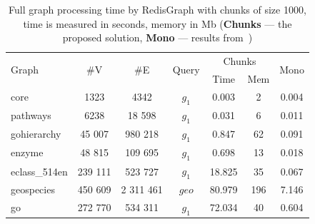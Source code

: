 {\setlength{\tabcolsep}{0.25em}
\begin{table}
{
\caption{Full graph processing time by RedisGraph with chunks of size 1000, time is measured in seconds, memory in Mb (\textbf{Chunks} --- the proposed solution, \textbf{Mono} --- results from~\cite{10.1145/3398682.3399163})}
\label{tbl:redis_full_graph_processing}
\small
{}
\begin{tabular}{|l|c|c|c|c|c|c|}
\hline
\multirow{2}{*}{Graph} & \multirow{2}{*}{\#V} & \multirow{2}{*}{\#E} & \multirow{2}{*}{Query} & \multicolumn{2}{c|}{Chunks}  &  \multirow{2}{*}{Mono}  \\
                       &                      &                      &                        & Time   & Mem & \\
\hline
\hline
core                   & 1323                 & 4342                 & $g_1$                  & 0.003  & 2                  &  0.004 \\
pathways               & 6238                 & 18 598               & $g_1$                  & 0.031  & 6                  &  0.011 \\
gohierarchy            & 45 007               & 980 218              & $g_1$                  & 0.847  & 62                  &  0.091 \\
enzyme                 & 48 815               & 109 695              & $g_1$                  & 0.698  & 13                  &  0.018 \\
eclass\_514en          & 239 111              & 523 727              & $g_1$                  & 18.825 & 35                   &  0.067 \\
geospecies             & 450 609              & 2 311 461            & $geo$                  & 80.979 & 196                  &  7.146 \\
go                     & 272 770              & 534 311              & $g_1$                  & 72.034 & 40                  &  0.604 \\
\hline
\end{tabular}
}
\end{table}
}

